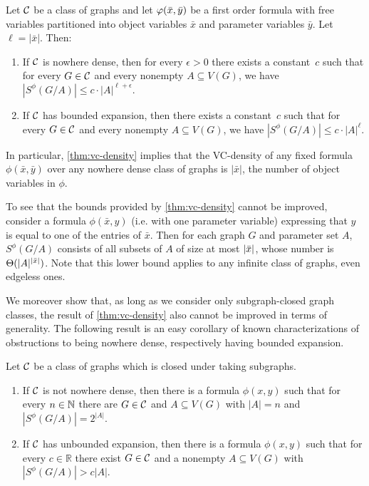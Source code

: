 \setcounter{vcupper}{\thetheorem}
\begin{theorem}\label{thm:vc-density}
Let $\mathcal{C}$ be a class of graphs and let $\varphi(\bar{x},\bar{y})$ be a first order formula
with free variables  partitioned  into object variables $\bar x$  and parameter variables $\bar y$. Let $\ell=|\bar x|$. Then:
\begin{enumerate}[(1)]
\item If $\mathcal{C}$ is nowhere dense, then for every $\epsilon>0$ 
there exists a constant~$c$ such that for every $G\in \mathcal{C}$ and every nonempty
$A\subseteq V(G)$, we have $|S^\phi(G/A)|\leq c\cdot |A|^{\ell+\epsilon}.$
\item If $\mathcal{C}$ has bounded expansion, then there exists a constant~$c$ such that for every $G\in \mathcal{C}$ and every nonempty $A\subseteq V(G)$, we have $|S^\phi(G/A)|\leq c\cdot |A|^\ell$.
\end{enumerate}
\end{theorem} 

In particular, \cref{thm:vc-density} implies that
the VC-density of any fixed formula 
$\phi(\bar x,\bar y)$ over any nowhere dense class of graphs is $|\bar x|$, the number of object variables in $\phi$.

To see that the bounds provided by \cref{thm:vc-density} cannot be improved, consider a formula $\phi(\bar x,y)$ (i.e. with one parameter variable) expressing that $y$ is equal to one of the entries of 
$\bar x$. Then for each graph $G$ and parameter set $A$, $S^{\phi}(G/A)$ consists of all subsets of $A$ of size at most $|\bar{x}|$, whose number is $\Theta(|A|^{|\bar{x}|})$. Note that
this lower bound applies to any infinite class of graphs, even edgeless ones.

We moreover show that, as long as we consider only subgraph-closed graph classes, the result of \cref{thm:vc-density} also cannot be improved in terms of generality.
The following result is an easy corollary of known characterizations of obstructions to being nowhere dense, respectively having bounded expansion.

\setcounter{vclower}{\thetheorem}
  \begin{theorem}\label{thm:vc-density-lower-bound}
  Let $\mathcal{C}$ be a class of graphs which 
  is closed under taking subgraphs. 
  \begin{enumerate}[(1)]
  \item If $\mathcal{C}$ is not nowhere dense, then there is a formula 
  $\phi(x,y)$ such that for every $n\in \mathbb{N}$ there are $G\in\mathcal{C}$ and $A\subseteq V(G)$ 
  with $|A|=n$ and $|S^\phi(G/A)|=2^{|A|}$. 
  \item If $\mathcal{C}$ has unbounded expansion, then there is a formula 
  $\phi(x,y)$ such that for every $c\in \mathbb{R}$ there exist $G\in\mathcal{C}$ and a nonempty $A\subseteq V(G)$ with $|S^\phi(G/A)|>c|A|$. 
  \end{enumerate}
  \end{theorem}


